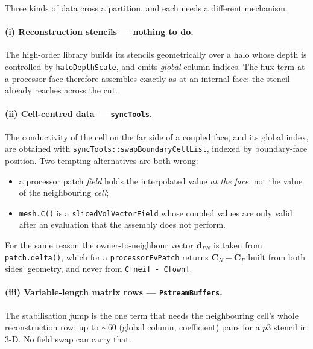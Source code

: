 \documentclass[11pt,a4paper]{article}
\newcommand{\code}[1]{\texttt{\small #1}}
\newcommand{\dictkey}[1]{\textcolor{black!60!green}{\texttt{\footnotesize #1}}}
\begin{document}
Three kinds of data cross a partition, and each needs a different mechanism.

\paragraph{(i) Reconstruction stencils --- nothing to do.}
The high-order library builds its stencils geometrically over a halo whose depth
is controlled by \dictkey{haloDepthScale}, and emits \emph{global} column
indices. The flux term at a processor face therefore assembles exactly as at an
internal face: the stencil already reaches across the cut.

\paragraph{(ii) Cell-centred data --- \code{syncTools}.}
The conductivity of the cell on the far side of a coupled face, and its global
index, are obtained with \code{syncTools::swapBoundaryCellList}, indexed by
boundary-face position. Two tempting alternatives are both wrong:

\begin{itemize}
  \item a processor patch \emph{field} holds the interpolated value \emph{at the
        face}, not the value of the neighbouring \emph{cell};
  \item \code{mesh.C()} is a \code{slicedVolVectorField} whose coupled values are
        only valid after an evaluation that the assembly does not perform.
\end{itemize}

For the same reason the owner-to-neighbour vector $\mathbf{d}_{PN}$ is taken
from \code{patch.delta()}, which for a \code{processorFvPatch} returns
$\mathbf{C}_{N}-\mathbf{C}_{P}$ built from both sides' geometry, and never from
\code{C[nei] - C[own]}.

\paragraph{(iii) Variable-length matrix rows --- \code{PstreamBuffers}.}
The stabilisation jump is the one term that needs the neighbouring cell's whole
reconstruction row: up to $\sim 60$ (global column, coefficient) pairs for a
$p3$ stencil in 3-D. No field swap can carry that.
\end{document}
